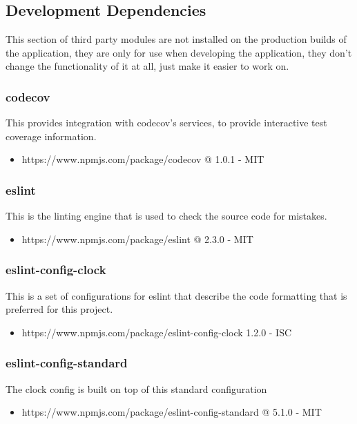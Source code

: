 \subsection{Development Dependencies}
  This section of third party modules are not installed on the production builds of the application, they are only for use when developing the application, they don't change the functionality of it at all, just make it easier to work on. 

  \subsubsection{codecov}
  This provides integration with codecov's services, to provide interactive test coverage information.
  \begin{itemize}
    \item https://www.npmjs.com/package/codecov @ 1.0.1 - MIT
  \end{itemize}

  \subsubsection{eslint}
  This is the linting engine that is used to check the source code for mistakes.
  \begin{itemize}
    \item https://www.npmjs.com/package/eslint @ 2.3.0 - MIT
  \end{itemize}

  \subsubsection{eslint-config-clock}
  This is a set of configurations for eslint that describe the code formatting that is preferred for this project.
  \begin{itemize}
    \item https://www.npmjs.com/package/eslint-config-clock 1.2.0 - ISC
  \end{itemize}

  \subsubsection{eslint-config-standard}
  The clock config is built on top of this standard configuration
  \begin{itemize}
    \item https://www.npmjs.com/package/eslint-config-standard @ 5.1.0 - MIT
  \end{itemize}

